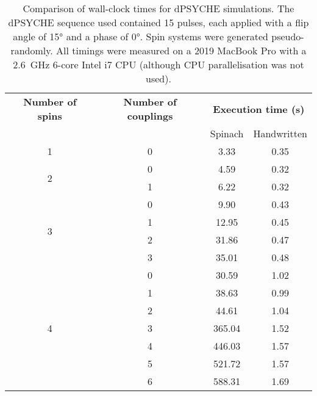 \begin{table}[htb]
    \begin{tabular}{cccc}
        \toprule
        \textbf{Number of spins} & \textbf{Number of couplings} & \multicolumn{2}{c}{\textbf{Execution time (s)}} \\
        \cmidrule{3-4}
                                 & & Spinach & Handwritten \\
                                 \midrule
        \multirow{1}{*}{1}       & 0 & 3.33 & 0.35 \\
        \midrule
        \multirow{2}{*}{2}       & 0 & 4.59 & 0.32 \\
                                 & 1 & 6.22 & 0.32 \\
                                 \midrule
        \multirow{4}{*}{3}       & 0 & 9.90  & 0.43 \\
                                 & 1 & 12.95 & 0.45 \\
                                 & 2 & 31.86 & 0.47 \\
                                 & 3 & 35.01 & 0.48 \\
                                 \midrule
        \multirow{7}{*}{4}       & 0 & 30.59  & 1.02 \\
                                 & 1 & 38.63  & 0.99 \\
                                 & 2 & 44.61  & 1.04 \\
                                 & 3 & 365.04 & 1.52 \\
                                 & 4 & 446.03 & 1.57 \\
                                 & 5 & 521.72 & 1.57 \\
                                 & 6 & 588.31 & 1.69 \\
        \bottomrule
    \end{tabular}
    \caption[Comparison of wall-clock times for dPSYCHE simulations]{
        Comparison of wall-clock times for dPSYCHE simulations.
        The dPSYCHE sequence used contained 15 pulses, each applied with a flip angle of \ang{15} and a phase of \ang{0}.
        Spin systems were generated pseudo-randomly.
        All timings were measured on a 2019 MacBook Pro with a \qty{2.6}{\GHz} 6-core Intel i7 CPU (although CPU parallelisation was not used).
    }
    \label{tbl:dpsyche_simulations}
\end{table}

